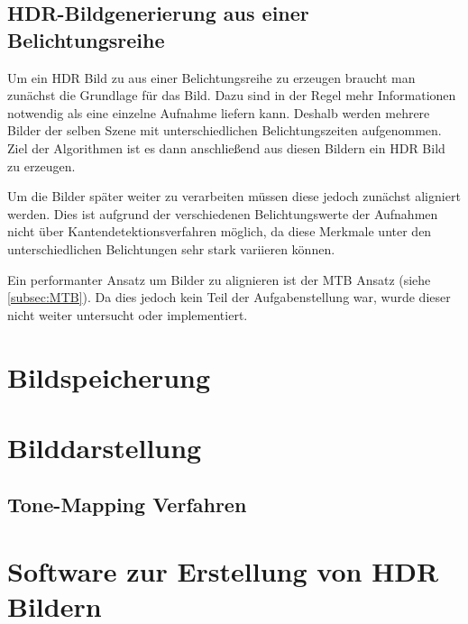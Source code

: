 \subsection{HDR-Bildgenerierung aus einer Belichtungsreihe}
\label{sub:belichtungsreihe}
Um ein \gls{HDR} Bild zu aus einer Belichtungsreihe zu erzeugen braucht man zunächst die Grundlage für das Bild. Dazu sind in der Regel mehr Informationen notwendig als eine einzelne Aufnahme liefern kann. Deshalb werden mehrere Bilder der selben Szene mit unterschiedlichen Belichtungszeiten aufgenommen. Ziel der Algorithmen ist es dann anschließend aus diesen Bildern ein \gls{HDR} Bild zu erzeugen.

Um die Bilder später weiter zu verarbeiten müssen diese jedoch zunächst aligniert werden. Dies ist aufgrund der verschiedenen Belichtungswerte der Aufnahmen nicht über Kantendetektionsverfahren möglich, da diese Merkmale unter den unterschiedlichen Belichtungen sehr stark variieren können.

Ein performanter Ansatz um Bilder zu alignieren ist der \gls{MTB} Ansatz (siehe \autoref{subsec:MTB}). Da dies jedoch kein Teil der Aufgabenstellung war, wurde dieser nicht weiter untersucht oder implementiert. 


\section{Bildspeicherung}
\section{Bilddarstellung}
\subsection{Tone-Mapping Verfahren}
\label{subsec:ToneMapping}


\section{Software zur Erstellung von \gls{HDR} Bildern}
